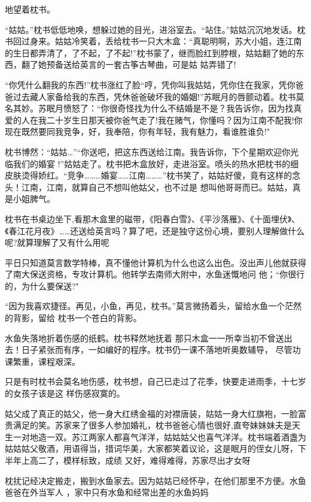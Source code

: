 \documentclass{article}
\begin{document}
地望着枕书。 

“姑姑。”枕书低低地唤，想躲过她的目光，进浴室去。“站住。”姑姑沉沉地发话。枕书回过身来。姑姑冷笑着，丢给枕书一只大木盒：“真聪明啊，苏大小姐，连江南的生日都弄清了，了不起，了不起!”枕书蒙了，继而脸红到脖根，姑姑翻了她的东西，翻了她预备送给英言的一套古筝古琴曲，可是姑
姑弄错了! 

“你凭什么翻我的东西!”枕书涨红了脸“哼，凭你叫我姑姑，凭你住在我家，凭你爸爸过去藏人家备给我的东西，凭休爸爸破坏我的婚姻!”苏眠月的唇颤动着。枕书莫名其妙。苏眠月愤怒了：“你很奇怪找为什么不结婚是不是？我告诉你，因为找真爱的人在我二十岁生日那天被你爸气走了!我在赌气，你懂吗？因为江南不配我!你现在既然要同我竞争，好，我奉陪，你有年轻，我有魅力，看谁胜谁负!"

枕书博然：“姑姑…”“你送吧，把这东西送给江南。我告诉你，下个星期欢迎你光临我们的婚宴
\newpage
!”姑姑走了。枕书把木盒放好，走进浴室。喷头的热水把枕书的细皮肤烫得娇红。“竞争………婚宴……江南………”枕书笑了，姑姑好傻，竟有这样的念头！江南，江南，就算自己不想叫他姑父，也不过是
想叫他哥哥而已。姑姑，真是小姐脾气。 

枕书在书桌边坐下,看那木盒里的磁带，《阳春白雪》、《平沙落雁》、《十面埋伏》、《春江花月夜》……还送给英言吗？算了吧，还是独守这份心境，要别人理解做什么呢?就算理解了又有什么用呢

平日只知道莫言数学特棒，真不懂他计算机为什么也这么出色。没出声儿他就获得了南大保送资格，专攻计算机。他转学去南师大附中，水鱼迷慨地问
他；“你很行的，为什么要保送?" 

“因为我喜欢捷径。再见，小鱼，再见，枕书。”莫言微扬着头，留给水鱼一个茫然的背影，留给
枕书一个苍白的背影。 

水鱼失落地折着伤感的纸鹤。枕书释然地抚着
\newpage
那只木盒一一所幸当初不曾送出去！日子紧张而有序，一如编好的程序。枕书仍一课不落地听奥数辅导，
尽管功课繁重，课程艰深。 

只是有时枕书会莫名地伤感，枕书想，自己已走过了花季，快要走进雨季，十七岁的女孩子该是这
样伤感寂寞的。 

姑父成了真正的姑父，他一身大红绣金福的对襟唐装，姑姑一身大红旗袍，一脸富贵满足的笑。苏家来了很多人参加婚礼，枕书爸爸心情也很好,直夸妹妹妹夫是天生一对地造一双。苏江两家人都喜气洋洋，姑姑姑父也喜气洋洋。枕书端着酒盏为姑姑姑父敬酒，用语得当，措词华美，大家都笑着议论，这是眠月的侄女儿呀，下半年上高二了，模样标致，成绩
又好，难得难得，苏家尽出才女呀 

枕扰记经决定搬走，搬到水鱼家去。因为姑姑已经怀孕，在他们那里不方便。水鱼爸爸在外当军人
，家中只有水鱼和经常出差的水鱼妈妈 

\newpage
\end{document}
